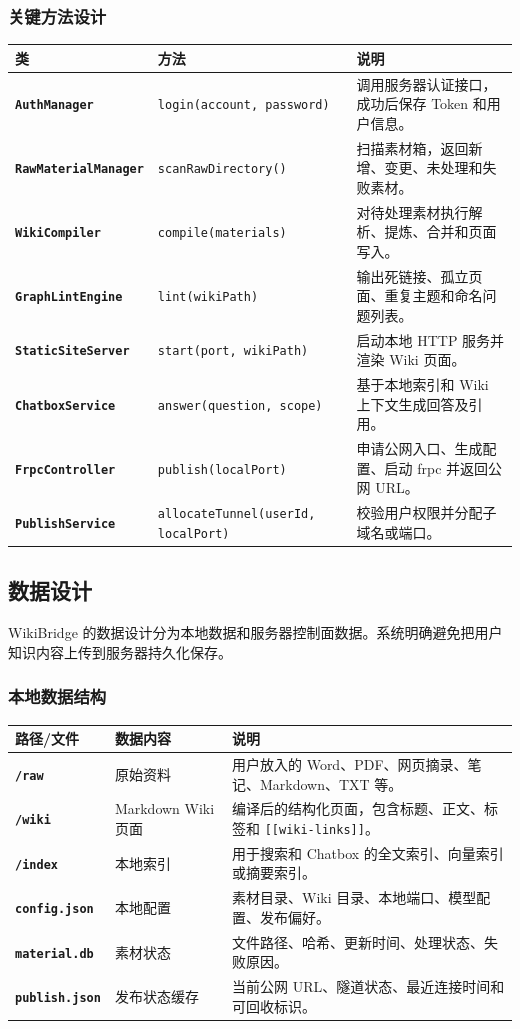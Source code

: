 \documentclass[UTF8,a4paper,12pt,fontset=fandol]{ctexart}
\newcommand{\code}[1]{\texttt{\footnotesize #1}}
\begin{document}
\subsubsection{关键方法设计}
\begin{longtable}{>{\bfseries}p{3.5cm}p{5.2cm}p{5.4cm}}
\toprule
类 & 方法 & 说明 \\
\midrule
\code{AuthManager} & \code{login(account, password)} & 调用服务器认证接口，成功后保存 Token 和用户信息。 \\
\code{RawMaterialManager} & \code{scanRawDirectory()} & 扫描素材箱，返回新增、变更、未处理和失败素材。 \\
\code{WikiCompiler} & \code{compile(materials)} & 对待处理素材执行解析、提炼、合并和页面写入。 \\
\code{GraphLintEngine} & \code{lint(wikiPath)} & 输出死链接、孤立页面、重复主题和命名问题列表。 \\
\code{StaticSiteServer} & \code{start(port, wikiPath)} & 启动本地 HTTP 服务并渲染 Wiki 页面。 \\
\code{ChatboxService} & \code{answer(question, scope)} & 基于本地索引和 Wiki 上下文生成回答及引用。 \\
\code{FrpcController} & \code{publish(localPort)} & 申请公网入口、生成配置、启动 frpc 并返回公网 URL。 \\
\code{PublishService} & \code{allocateTunnel(userId, localPort)} & 校验用户权限并分配子域名或端口。 \\
\bottomrule
\end{longtable}

\subsection{数据设计}
WikiBridge 的数据设计分为本地数据和服务器控制面数据。系统明确避免把用户知识内容上传到服务器持久化保存。

\subsubsection{本地数据结构}
\begin{longtable}{>{\bfseries}p{3.0cm}p{4.0cm}p{7.0cm}}
\toprule
路径/文件 & 数据内容 & 说明 \\
\midrule
\code{/raw} & 原始资料 & 用户放入的 Word、PDF、网页摘录、笔记、Markdown、TXT 等。 \\
\code{/wiki} & Markdown Wiki 页面 & 编译后的结构化页面，包含标题、正文、标签和 \code{[[wiki-links]]}。 \\
\code{/index} & 本地索引 & 用于搜索和 Chatbox 的全文索引、向量索引或摘要索引。 \\
\code{config.json} & 本地配置 & 素材目录、Wiki 目录、本地端口、模型配置、发布偏好。 \\
\code{material.db} & 素材状态 & 文件路径、哈希、更新时间、处理状态、失败原因。 \\
\code{publish.json} & 发布状态缓存 & 当前公网 URL、隧道状态、最近连接时间和可回收标识。 \\
\bottomrule
\end{longtable}
\end{document}
